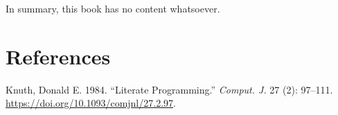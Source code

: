 \documentclass[
  letterpaper,
  DIV=11,
  numbers=noendperiod]{scrreprt}
\newlength{\cslhangindent}
\newenvironment{CSLReferences}[2] %
 {\begin{list}{}{%
  \setlength{\itemindent}{0pt}
  \setlength{\leftmargin}{0pt}
  \setlength{\parsep}{0pt}
  \ifodd #1
   \setlength{\leftmargin}{\cslhangindent}
   \setlength{\itemindent}{-1\cslhangindent}
  \fi
  \setlength{\itemsep}{#2\baselineskip}}}
 {\end{list}}
\begin{document}
In summary, this book has no content whatsoever.


\chapter*{References}\label{references}


\label{refs}
\begin{CSLReferences}{1}{0}
Knuth, Donald E. 1984. {``Literate Programming.''} \emph{Comput. J.} 27
(2): 97--111. \url{https://doi.org/10.1093/comjnl/27.2.97}.

\end{CSLReferences}
\end{document}
